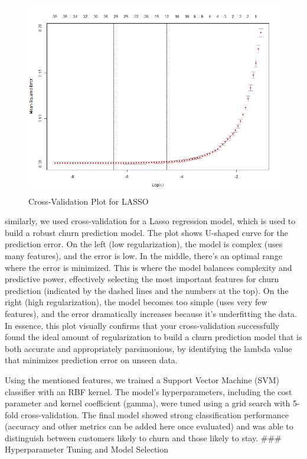 \documentclass[
]{article}
\begin{document}
\begin{figure}

{\centering \includegraphics[width=0.85\linewidth]{Plots/lasso_cv_plot} 

}

\caption{Cross-Validation Plot for LASSO}\label{fig:lasso-cv-plot-img}
\end{figure}

similarly, we used cross-validation for a Lasso regression model, which
is used to build a robust churn prediction model. The plot shows
U-shaped curve for the prediction error. On the left (low
regularization), the model is complex (uses many features), and the
error is low. In the middle, there's an optimal range where the error is
minimized. This is where the model balances complexity and predictive
power, effectively selecting the most important features for churn
prediction (indicated by the dashed lines and the numbers at the top).
On the right (high regularization), the model becomes too simple (uses
very few features), and the error dramatically increases because it's
underfitting the data. In essence, this plot visually confirms that your
cross-validation successfully found the ideal amount of regularization
to build a churn prediction model that is both accurate and
appropriately parsimonious, by identifying the lambda value that
minimizes prediction error on unseen data.

Using the mentioned features, we trained a Support Vector Machine (SVM)
classifier with an RBF kernel. The model's hyperparameters, including
the cost parameter and kernel coefficient (gamma), were tuned using a
grid search with 5-fold cross-validation. The final model showed strong
classification performance (accuracy and other metrics can be added here
once evaluated) and was able to distinguish between customers likely to
churn and those likely to stay. \#\#\# Hyperparameter Tuning and Model
Selection
\end{document}
